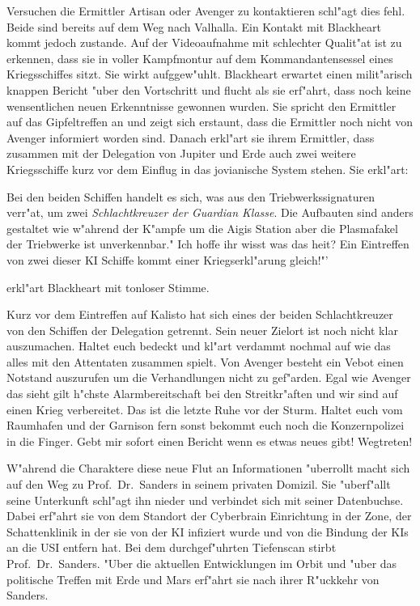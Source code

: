 Versuchen die Ermittler Artisan oder Avenger zu kontaktieren schl"agt dies fehl. Beide sind bereits auf dem Weg nach Valhalla. Ein Kontakt mit Blackheart kommt jedoch zustande. Auf der Videoaufnahme mit schlechter Qualit"at ist zu erkennen, dass sie in voller Kampfmontur auf dem Kommandantensessel eines Kriegsschiffes sitzt. Sie wirkt aufggew"uhlt. Blackheart erwartet einen milit"arisch knappen Bericht "uber den Vortschritt und flucht als sie erf"ahrt, dass noch keine wensentlichen neuen Erkenntnisse gewonnen wurden. Sie spricht den Ermittler auf das Gipfeltreffen an und zeigt sich erstaunt, dass die Ermittler noch nicht von Avenger informiert worden sind. Danach erkl"art sie ihrem Ermittler, dass zusammen mit der Delegation von Jupiter und Erde auch zwei weitere Kriegsschiffe kurz vor dem Einflug in das jovianische System stehen. Sie erkl"art:

\begin{speech}
	Bei den beiden Schiffen handelt es sich, was aus den Triebwerkssignaturen verr"at, um zwei \emph{Schlachtkreuzer der Guardian Klasse}. Die Aufbauten sind anders gestaltet wie w"ahrend der K"ampfe um die Aigis Station aber die Plasmafakel der Triebwerke ist unverkennbar." Ich hoffe ihr wisst was das hei\3t? Ein Eintreffen von zwei dieser KI Schiffe kommt einer Kriegserkl"arung gleich!"' 
\end{speech}

erkl"art Blackheart mit tonloser Stimme. 

\begin{speech}
	Kurz vor dem Eintreffen auf Kalisto hat sich eines der beiden Schlachtkreuzer von den Schiffen der Delegation getrennt. Sein neuer Zielort ist noch nicht klar auszumachen. Haltet euch bedeckt und kl"art verdammt nochmal auf wie das alles mit den Attentaten zusammen spielt. Von Avenger besteht ein Vebot einen Notstand auszurufen um die Verhandlungen nicht zu gef"arden. Egal wie Avenger das sieht gilt h"chste Alarmbereitschaft bei den Streitkr"aften und wir sind auf einen Krieg verbereitet. Das ist die letzte Ruhe vor der Sturm. Haltet euch vom Raumhafen und der Garnison fern sonst bekommt euch noch die Konzernpolizei in die Finger. Gebt mir sofort einen Bericht wenn es etwas neues gibt! Wegtreten!
\end{speech}

W"ahrend die Charaktere diese neue Flut an Informationen "uberrollt macht sich \xl{} auf den Weg zu Prof.~Dr.~Sanders in seinem privaten Domizil. Sie "uberf"allt seine Unterkunft schl"agt ihn nieder und verbindet sich mit seiner Datenbuchse. Dabei erf"ahrt sie von dem Standort der Cyberbrain Einrichtung in der Zone, der Schattenklinik in der sie von der KI infiziert wurde und von \emph{} die Bindung der KIs an die USI entfern hat. Bei dem durchgef"uhrten Tiefenscan stirbt Prof.~Dr.~Sanders. "Uber die aktuellen Entwicklungen im Orbit und "uber das politische Treffen mit Erde und Mars erf"ahrt sie nach ihrer R"uckkehr von Sanders.

